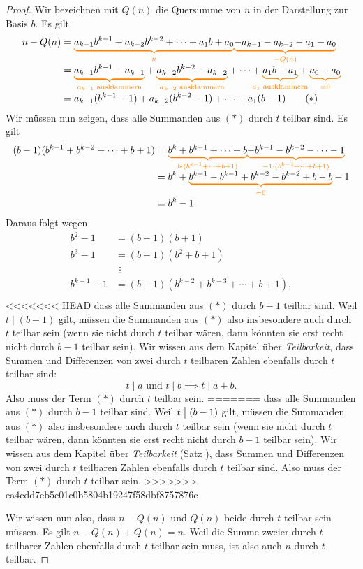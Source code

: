 \documentclass[../../main.tex]{subfiles}
\begin{document}
\begin{proof}
    Wir bezeichnen mit $Q(n)$ die Quersumme von $n$ in der Darstellung zur Basis $b$. Es gilt
    \begin{align*}
        n-Q(n)&=\colorbrace{a_{k-1}b^{k-1}+a_{k-2}b^{k-2}+\dots+a_1b+a_0}{n}\colorbrace{-a_{k-1}-a_{k-2}-a_1-a_0}{-Q(n)}\\
        &=\colorbrace{a_{k-1}b^{k-1}-a_{k-1}}{a_{k-1}\text{ ausklammern}}+\colorbrace{a_{k-2}b^{k-2}-a_{k-2}}{a_{k-2}\text{ ausklammern}}+\dots+\colorbrace{a_1b-a_1}{a_1\text{ ausklammern}}+\colorbrace{a_0-a_0}{=0}\\
        &=a_{k-1}(b^{k-1}-1)+a_{k-2}(b^{k-2}-1)+\dots+a_1(b-1)\tag{$*$}
    \end{align*}
    Wir müssen nun zeigen, dass alle Summanden aus $(*)$ durch $t$ teilbar sind. Es gilt
    \begin{align*}
        (b-1)(b^{k-1}+b^{k-2}+\cdots+b+1)
        &=\colorbrace{b^k+b^{k-1}+\cdots+b}{b\cdot(b^{k-1}+\cdots+b+1)}\colorbrace{-b^{k-1}-b^{k-2}-\cdots-1}{-1\cdot(b^{k-1}+\cdots+b+1)}\\
        &=b^k+\colorbrace{b^{k-1}-b^{k-1}+b^{k-2}-b^{k-2}+b-b}{=0}-1\\
        &=b^k-1.
    \end{align*}
    Daraus folgt wegen
    \begin{align*}
        b^2-1&=(b-1)(b+1)\\
        b^3-1&=(b-1)(b^2+b+1)\\
        &~\,\vdots\\
        b^{k-1}-1&=(b-1)(b^{k-2}+b^{k-3}+\cdots+b+1),\\
    \end{align*}
<<<<<<< HEAD
    dass alle Summanden aus $(*)$ durch $b-1$ teilbar sind. Weil $t\mid(b-1)$ gilt, müssen die Summanden aus $(*)$ also insbesondere auch durch $t$ teilbar sein (wenn sie nicht durch $t$ teilbar wären, dann könnten sie erst recht nicht durch $b-1$ teilbar sein). Wir wissen aus dem Kapitel über \emph{Teilbarkeit}, dass Summen und Differenzen von zwei durch $t$ teilbaren Zahlen ebenfalls durch $t$ teilbar sind:
    \[t\mid a\text{ und }t\mid b\implies t\mid a\pm b.\] 
    Also muss der Term $(*)$ durch $t$ teilbar sein. 
=======
    dass alle Summanden aus $(*)$ durch $b-1$ teilbar sind. Weil $t\divides (b-1)$ gilt, müssen die Summanden aus $(*)$
    also insbesondere auch durch $t$ teilbar sein (wenn sie nicht durch $t$ teilbar wären, dann könnten sie erst recht
    nicht durch $b-1$ teilbar sein). Wir wissen aus dem Kapitel über \emph{Teilbarkeit} (Satz \mayberef), dass Summen
    und Differenzen von zwei durch $t$ teilbaren Zahlen ebenfalls durch $t$ teilbar sind. Also muss der Term $(*)$ durch
    $t$ teilbar sein. 
>>>>>>> ea4cdd7eb5c01c0b5804b19247f58dbf8757876c
    
    Wir wissen nun also, dass $n-Q(n)$ und $Q(n)$ beide durch $t$ teilbar sein müssen. Es gilt $n-Q(n)+Q(n)=n$. Weil die
    Summe zweier durch $t$ teilbarer Zahlen ebenfalls durch $t$ teilbar sein muss, ist also auch $n$ durch $t$ teilbar.
\end{proof}
\end{document}
